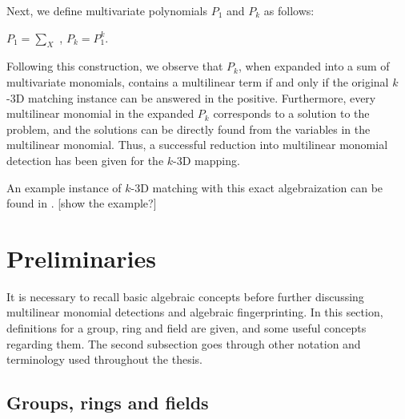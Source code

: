 Next, we define multivariate polynomials $P_1$ and $P_k$ as follows:
\begin{center}$P_1 = \displaystyle \sum_{X}$ ,   $P_k = P_1^k$.\end{center}

Following this construction, we observe that $P_k$, when expanded into a sum of multivariate monomials, 
contains a multilinear term if and only if the original $k$-3D matching instance can be answered in the positive. 
Furthermore, every multilinear monomial in the expanded $P_k$ corresponds to a solution to the problem, and 
the solutions can be directly found from the variables in the multilinear monomial. Thus, 
a successful reduction into multilinear monomial detection has been given for the $k$-3D mapping.\nl

An example instance of $k$-3D matching with this exact algebraization can be found in \cite{KouWil15}. [show the example?]\nl




\section{Preliminaries}

It is necessary to recall basic algebraic concepts 
before further discussing multilinear monomial detections and algebraic fingerprinting. 
In this section, definitions for a group, ring and field are given, and some useful concepts 
regarding them. The second subsection goes through other notation and terminology used 
throughout the thesis.

\subsection{Groups, rings and fields} %

